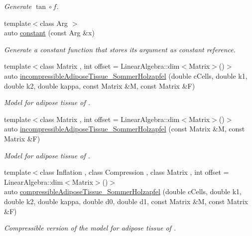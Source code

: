 \begin{DoxyCompactItemize}
\begin{DoxyCompactList}\small\item\em Generate $ \tan\circ f $. \end{DoxyCompactList}\item 
{\footnotesize template$<$class Arg $>$ }\\auto \hyperlink{namespaceFunG_a65c509062b62b3303268cabc97b75a65}{constant} (const Arg \&x)
\begin{DoxyCompactList}\small\item\em Generate a constant function that stores its argument as constant reference. \end{DoxyCompactList}\item 
{\footnotesize template$<$class Matrix , int offset = Linear\+Algebra\+::dim$<$\+Matrix$>$()$>$ }\\auto \hyperlink{group__Biomechanics_gac269eefc1abb994044e1634c20a98061}{incompressible\+Adipose\+Tissue\+\_\+\+Sommer\+Holzapfel} (double c\+Cells, double k1, double k2, double kappa, const Matrix \&M, const Matrix \&F)
\begin{DoxyCompactList}\small\item\em Model for adipose tissue of \cite{Sommer2013}. \end{DoxyCompactList}\item 
{\footnotesize template$<$class Matrix , int offset = Linear\+Algebra\+::dim$<$\+Matrix$>$()$>$ }\\auto \hyperlink{group__Biomechanics_ga01ab128bcf179f4431b0270179af9e20}{incompressible\+Adipose\+Tissue\+\_\+\+Sommer\+Holzapfel} (const Matrix \&M, const Matrix \&F)
\begin{DoxyCompactList}\small\item\em Model for adipose tissue of \cite{Sommer2013}. \end{DoxyCompactList}\item 
{\footnotesize template$<$class Inflation , class Compression , class Matrix , int offset = Linear\+Algebra\+::dim$<$\+Matrix$>$()$>$ }\\auto \hyperlink{group__Biomechanics_ga5c3388564c0420b62e58f48c739d27f1}{compressible\+Adipose\+Tissue\+\_\+\+Sommer\+Holzapfel} (double c\+Cells, double k1, double k2, double kappa, double d0, double d1, const Matrix \&M, const Matrix \&F)
\begin{DoxyCompactList}\small\item\em Compressible version of the model for adipose tissue of \cite{Sommer2013}. \end{DoxyCompactList}\item 

\end{DoxyCompactItemize}
